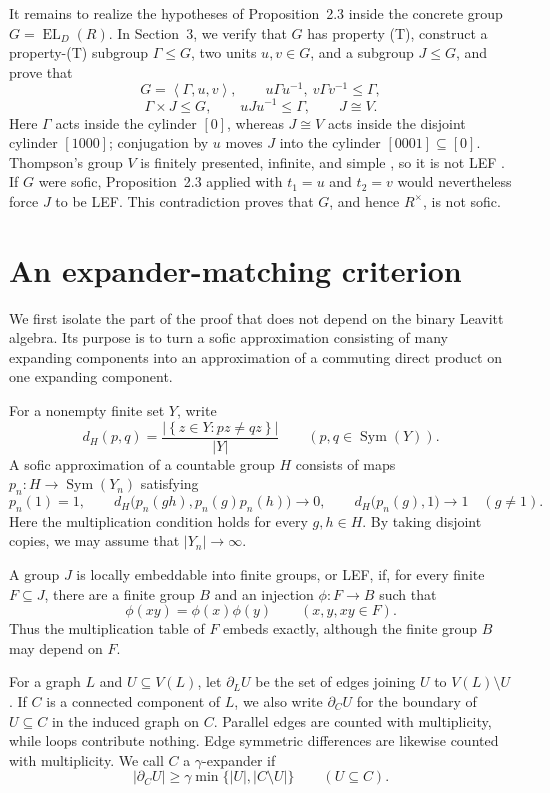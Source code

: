 \documentclass[10pt]{article}
\newcommand{\Sym}{\operatorname{Sym}}
\newcommand{\EL}{\operatorname{EL}}
\newcommand{\abs}[1]{\left|#1\right|}
\newcommand{\set}[1]{\left\{#1\right\}}
\newcommand{\angles}[1]{\left\langle #1\right\rangle}
\begin{document}
It remains to realize the hypotheses of Proposition~2.3 inside the concrete group $G=\EL_D(R)$. In Section~3, we verify that $G$ has property (T), construct a property-(T) subgroup $\Gamma\leq G$, two units $u,v\in G$, and a subgroup $J\leq G$, and prove that
\[
G=\angles{\Gamma,u,v},\qquad u\Gamma u^{-1},\ v\Gamma v^{-1}\leq\Gamma,
\]
\[
\Gamma\times J\leq G,\qquad uJu^{-1}\leq\Gamma,\qquad J\cong V.
\]
Here $\Gamma$ acts inside the cylinder $[0]$, whereas $J\cong V$ acts inside the disjoint cylinder $[1000]$; conjugation by $u$ moves $J$ into the cylinder $[0001]\subseteq[0]$. Thompson's group $V$ is finitely presented, infinite, and simple \cite{CFP96}, so it is not LEF \cite[Theorem~2.2]{VG97}. If $G$ were sofic, Proposition~2.3 applied with $t_1=u$ and $t_2=v$ would nevertheless force $J$ to be LEF\@. This contradiction proves that $G$, and hence $R^\times$, is not sofic.

\section{An expander-matching criterion}

We first isolate the part of the proof that does not depend on the binary Leavitt algebra. Its purpose is to turn a sofic approximation consisting of many expanding components into an approximation of a commuting direct product on one expanding component.

For a nonempty finite set $Y$, write
\[
d_H(p,q)=\frac{\abs{\set{z\in Y:pz\neq qz}}}{\abs{Y}}\qquad(p,q\in\Sym(Y)).
\]
A sofic approximation of a countable group $H$ consists of maps $p_n:H\to\Sym(Y_n)$ satisfying
\[
p_n(1)=1,\qquad d_H\bigl(p_n(gh),p_n(g)p_n(h)\bigr)\longrightarrow0,\qquad d_H\bigl(p_n(g),1\bigr)\longrightarrow1\quad(g\neq1).
\]
Here the multiplication condition holds for every $g,h\in H$. By taking disjoint copies, we may assume that $\abs{Y_n}\to\infty$.

A group $J$ is locally embeddable into finite groups, or LEF, if, for every finite $F\subseteq J$, there are a finite group $B$ and an injection $\phi:F\to B$ such that
\[
\phi(xy)=\phi(x)\phi(y)\qquad(x,y,xy\in F).
\]
Thus the multiplication table of $F$ embeds exactly, although the finite group $B$ may depend on $F$.

For a graph $L$ and $U\subseteq V(L)$, let $\partial_LU$ be the set of edges joining $U$ to $V(L)\setminus U$. If $C$ is a connected component of $L$, we also write $\partial_CU$ for the boundary of $U\subseteq C$ in the induced graph on $C$. Parallel edges are counted with multiplicity, while loops contribute nothing. Edge symmetric differences are likewise counted with multiplicity. We call $C$ a $\gamma$-expander if
\begin{equation}
\abs{\partial_CU}\geq\gamma\min\{\abs{U},\abs{C\setminus U}\}\qquad(U\subseteq C).
\tag{3}
\end{equation}
\end{document}
